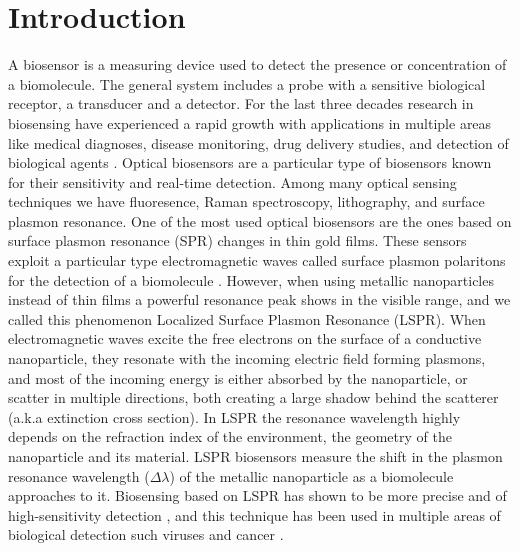 \chapter{Introduction} \label{chap:intro}

A biosensor is a measuring device used to detect the presence or concentration of a biomolecule. The general system includes 
a probe with a sensitive biological receptor, a transducer and a detector. For the last three decades research in biosensing have experienced a rapid growth with applications in multiple areas like
medical diagnoses, disease monitoring, drug delivery studies, and detection of biological agents 
\cite{Turner2000, Mohanty2006, Mehrotra2016}. Optical biosensors are a particular type of biosensors known for their sensitivity and real-time detection. Among many 
optical sensing techniques we have fluoresence, Raman spectroscopy, lithography, and surface plasmon resonance. One of the most used optical biosensors are the
ones based on surface plasmon resonance (SPR) changes in thin gold films. These sensors exploit a particular type electromagnetic waves 
called surface plasmon polaritons for the detection of a biomolecule \cite{Homola2008}. However, when using metallic nanoparticles instead of 
thin films a powerful resonance peak shows in the visible range, and we called this phenomenon Localized Surface Plasmon Resonance (LSPR). When electromagnetic
waves excite the free electrons on the surface of a conductive nanoparticle, they resonate with the incoming electric field forming plasmons, and 
most of the incoming energy is either absorbed by the nanoparticle, or scatter in multiple directions, both creating a large shadow behind the scatterer 
(a.k.a extinction cross section). In LSPR the resonance wavelength highly depends on the refraction index of the environment, the geometry of the nanoparticle and its material.  
LSPR biosensors measure the shift in the plasmon resonance wavelength ($\Delta\lambda$) of the metallic nanoparticle as a biomolecule approaches to it.
Biosensing based on LSPR has shown to be more precise and of high-sensitivity detection \cite{Sepulveda2009}, and this technique has been used in 
multiple areas of biological detection such viruses and cancer \cite{Wang2010, Liu2014, Zhu2016}. 

